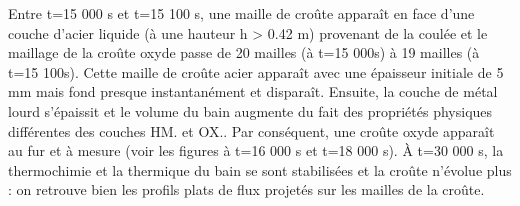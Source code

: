 Entre t=15 000 s et t=15 100 s, une maille de croûte apparaît en face d'une couche d'acier liquide (à une hauteur h > 0.42 m) provenant de la coulée et le maillage de la croûte oxyde passe de 20 mailles (à t=15 000s) à 19 mailles (à t=15 100s). Cette maille de croûte acier apparaît avec une épaisseur initiale de 5 mm mais fond presque instantanément et disparaît. Ensuite, la couche de métal lourd s'épaissit et le volume du bain augmente du fait des propriétés physiques différentes des couches HM. et OX.. Par conséquent, une croûte oxyde apparaît au fur et à mesure (voir les figures à t=16 000 s et t=18 000 s). À t=30 000 s, la thermochimie et la thermique du bain se sont stabilisées et la croûte n'évolue plus : on retrouve bien les profils plats de flux projetés sur les mailles de la croûte. 

